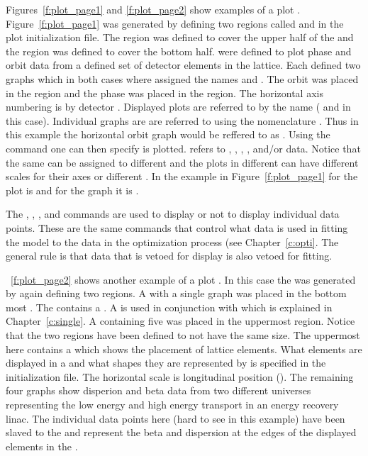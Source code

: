 Figures~\ref{f:plot_page1} and \ref{f:plot_page2} show examples
of a plot . Figure~\ref{f:plot_page1} was generated by
defining two regions called  and  in the plot 
initialization file. The  region was defined to cover the upper half
of the  and the  region was 
defined to cover the bottom half.  were defined to plot phase
and orbit data from a defined set of detector elements in the lattice. Each 
 defined two graphs which in both cases where assigned the
names  and . The orbit
 was placed in the  region and the phase 
was placed in the  region. The horizontal axis numbering 
is by detector .
Displayed plots are referred to by the  name ( and  in
this case). Individual graphs are are referred to using the nomenclature 
. Thus in this example the horizontal orbit graph
would be reffered to as . 
Using the  command one can then specify  is
plotted.  refers to , , ,
, and/or  data.  Notice that the same  can be assigned to different  and the plots in different
 can have different scales for their axes or different
. In the example in Figure~\ref{f:plot_page1}  for the 
plot is  and for the  graph it is . 

The , , ,
and  commands are used to display or not to display
individual data points. These are the same commands that control what
data is used in fitting the model to the data in the optimization process
(see Chapter~\ref{c:opti}. The general rule is
that data that is vetoed for display is also vetoed for fitting.

\Figure~\ref{f:plot_page2} shows another example of a plot .
In this case the  was generated by again defining two regions.
A  with a single graph was placed in the bottom most .
The  contains a .
A  is used in conjunction with  which is explained 
in Chapter~\ref{c:single}. A  containing five  was placed in
the uppermost region. Notice that the two regions have been defined to not have the same size. 
The uppermost  here contains a  which shows
the placement of lattice elements. 
What elements are displayed in a  and what shapes they are represented by 
is specified in the initialization file. 
The horizontal scale is longitudinal position ().
The remaining four graphs show disperion and beta
data from two different universes representing the low energy and high energy transport in
an energy recovery linac. The individual data points here (hard to see in this example) have
been slaved to the  and represent the beta and dispersion at the edges of the
displayed elements in the .


